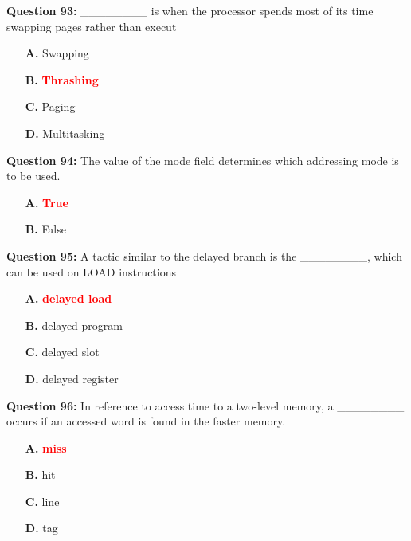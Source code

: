 \documentclass[12pt,a4paper]{article}
\begin{document}
\vspace{0.5cm}

\textbf{Question 93:} ________ is when the processor spends most of its time swapping pages rather than execut

\begin{itemize}
    \item[\textbf{A.}] Swapping
    \item[\textbf{B.}] \textcolor{red}{\textbf{Thrashing}}
    \item[\textbf{C.}] Paging
    \item[\textbf{D.}] Multitasking
\end{itemize}

\vspace{0.5cm}

\textbf{Question 94:} The value of the mode field determines which addressing mode is to be used.

\begin{itemize}
    \item[\textbf{A.}] \textcolor{red}{\textbf{True}}
    \item[\textbf{B.}] False
\end{itemize}

\vspace{0.5cm}

\textbf{Question 95:} A tactic similar to the delayed branch is the ________, which can be used on LOAD instructions

\begin{itemize}
    \item[\textbf{A.}] \textcolor{red}{\textbf{delayed load}}
    \item[\textbf{B.}] delayed program
    \item[\textbf{C.}] delayed slot
    \item[\textbf{D.}] delayed register
\end{itemize}

\vspace{0.5cm}

\textbf{Question 96:} In reference to access time to a two-level memory, a ________ occurs if an accessed word is found in the faster memory.

\begin{itemize}
    \item[\textbf{A.}] \textcolor{red}{\textbf{miss}}
    \item[\textbf{B.}] hit
    \item[\textbf{C.}] line
    \item[\textbf{D.}] tag
\end{itemize}
\end{document}
